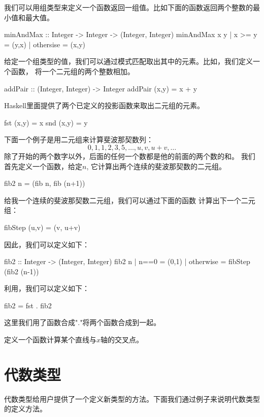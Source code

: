 我们可以用组类型来定义一个函数返回一组值。比如下面的函数返回两个整数的最小值和最大值。
\begin{code}
minAndMax :: Integer -> Integer -> (Integer, Integer)
minAndMax x y
  | x >= y     = (y,x)
  | othersise  = (x,y)
\end{code}

给定一个组类型的值，我们可以通过模式匹配取出其中的元素。比如，我们定义一个函数，
将一个二元组的两个整数相加。
\begin{code}
addPair :: (Integer, Integer) -> Integer
addPair (x,y) = x + y
\end{code}

Haskell里面提供了两个已定义的投影函数来取出二元组的元素。
\begin{code}
fst (x,y) = x
snd (x,y) = y
\end{code}

下面一个例子是用二元组来计算斐波那契数列：
\[
0, 1, 1, 2, 3, 5, \ldots, u, v, u+v, \ldots
\]
除了开始的两个数字以外，后面的任何一个数都是他的前面的两个数的和。
我们首先定义一个函数，给定$n$, 它计算出两个连续的斐波那契数的二元组。
\begin{code}
fib2 n = (fib n, fib (n+1))
\end{code}
给我一个连续的斐波那契数二元组，我们可以通过下面的函数
计算出下一个二元组：
\begin{code}
fibStep (u,v) = (v, u+v)
\end{code}
因此，我们可以定义如下：
\begin{code}
fib2 :: Integer -> (Integer, Integer)
fib2 n
  | n==0      = (0,1)
  | otherwise = fibStep (fib2 (n-1))
\end{code}
利用，我们可以定义如下：
\begin{code}
fib2 = fst . fib2
\end{code}
这里我们用了函数合成"."将两个函数合成到一起。

\begin{exercise}
定义一个函数计算某个直线与$x$轴的交叉点。
\end{exercise}

\section{代数类型}

代数类型给用户提供了一个定义新类型的方法。下面我们通过例子来说明代数类型的定义方法。

